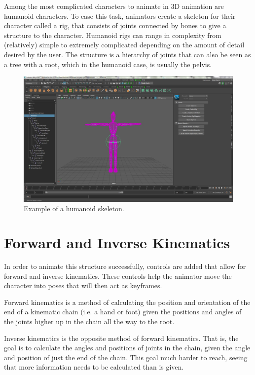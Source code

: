 Among the most complicated characters to animate in 3D animation are humanoid characters. To ease this task, animators create a skeleton for their character called a rig, that consists of joints connected by bones to give a structure to the character. Humanoid rigs can range in complexity from (relatively) simple to extremely complicated depending on the amount of detail desired by the user. The structure is a hierarchy of joints that can also be seen as a tree with a root, which in the humanoid case, is usually the pelvis.

\begin{figure}[h!]
\includegraphics[scale=0.3]{img/skeleton}
\caption{Example of a humanoid skeleton.}
\end{figure}

\section{Forward and Inverse Kinematics}
In order to animate this structure successfully, controls are added that allow for forward and inverse kinematics. These controls help the animator move the character into poses that will then act as keyframes.

Forward kinematics is a method of calculating the position and orientation of the end of a kinematic chain (i.e. a hand or foot) given the positions and angles of the joints higher up in the chain all the way to the root. 

Inverse kinematics is the opposite method of forward kinematics. That is, the goal is to calculate the angles and positions of joints in the chain, given the angle and position of just the end of the chain. This goal much harder to reach, seeing that more information needs to be calculated than is given.

